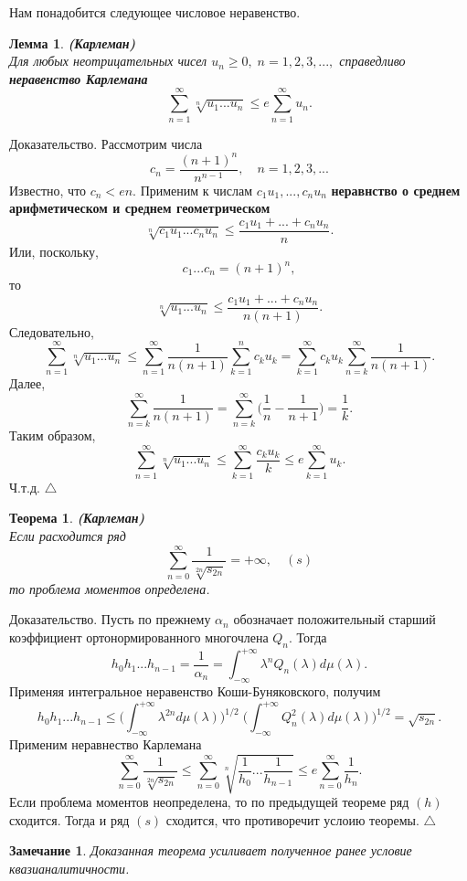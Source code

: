 \documentclass[12pt,a4paper]{article}
\theoremstyle{plain}   \newtheorem{Pro}{Задача}
\newtheorem{Rem}{Замечание}
\newtheorem{The}{Теорема}
\newtheorem{Lem}{Лемма}
\begin{document}
Нам понадобится следующее числовое неравенство.
\begin{Lem}
{\bfseries (Карлеман)}
\\
Для любых неотрицательных чисел
$ u_n \geq 0, \; n=1,2,3,..., $
справедливо
{\bfseries неравенство Карлемана}
$$
  \sum _{n=1}^{\infty}
  \sqrt[n]{u_1 ...u_n } \leq e
  \sum _{n=1}^{\infty} u_n .
$$
\end{Lem}
{\Large Доказательство.}
Рассмотрим числа
$$
  c_n =\frac{(n+1)^n}{n^{n-1}}, \quad n=1,2,3,...
$$
Известно, что
$ c_n <en. $
Применим к числам
$ c_1 u_1 ,...,c_n u_n $
{\bfseries неравнство о среднем арифметическом и среднем геометрическом}
$$
  \sqrt[n]{c_1 u_1 ...c_n u_n } \leq
  \frac{c_1 u_1 +...+c_n u_n }{n}.
$$
Или, поскольку,
$$
  c_1 ...c_n =(n+1)^n ,
$$
то
$$
 \sqrt[n]{u_1 ...u_n} \leq
 \frac{c_1 u_1 +...+c_n u_n}{n(n+1)}.
$$
Следовательно,
$$
  \sum _{n=1}^{\infty}\sqrt[n]{u_1 ...u_n} \leq
  \sum _{n=1}^{\infty} \frac{1}{n(n+1)}
  \sum _{k=1}^n c_k u_k =
  \sum _{k=1}^{\infty} c_k u_k
  \sum _{n=k}^{\infty} \frac{1}{n(n+1)}.
$$
Далее,
$$
  \sum _{n=k}^{\infty} \frac{1}{n(n+1)}=
  \sum _{n=k}^{\infty} \biggl ( \frac{1}{n}-
  \frac{1}{n+1} \biggr ) =\frac{1}{k} .
$$
Таким образом,
$$
  \sum _{n=1}^{\infty} \sqrt[n]{u_1 ...u_n} \leq
  \sum _{k=1}^{\infty}\frac{c_k u_k}{k} \leq
  e \sum _{k=1}^{\infty}u_k .
$$
Ч.т.д.
$ \triangle $
\begin{The}
{\bfseries (Карлеман)}
\\
Если расходится ряд
$$
  \sum _{n=0}^{\infty} \frac{1}{\sqrt[2n]{s_{2n}}}
  =+\infty , \quad (s)
$$
то проблема моментов определена.
\end{The}
{\Large Доказательство.}
Пусть по прежнему
$ \alpha _n $
обозначает положительный старший коэффициент ортонормированного
многочлена
$ Q_n . $
Тогда
$$
  h_0 h_1 ...h_{n-1}=\frac{1}{\alpha _n}=
  \int _{-\infty}^{+\infty}
  \lambda ^n Q_n (\lambda )d\mu (\lambda ).
$$
Применяя интегральное неравенство Коши-Буняковского, получим
$$
  h_0 h_1 ...h_{n-1} \leq
  \Biggl ( \int _{-\infty}^{+\infty}
  \lambda ^{2n}d\mu (\lambda ) \Biggr ) ^{1/2} \;
  \Biggl ( \int _{-\infty}^{+\infty}
  Q_n ^2 (\lambda )d\mu (\lambda ) \Biggr ) ^{1/2}
  =\sqrt{s_{2n}}.
$$
Применим неравнество Карлемана
$$
  \sum _{n=0}^{\infty} \frac{1}{\sqrt[2n]{s_{2n}}} \leq
  \sum _{n=0}^{\infty} \sqrt[n]{\frac{1}{h_0}...
  \frac{1}{h_{n-1}}} \leq e
  \sum _{n=0}^{\infty} \frac{1}{h_n} .
$$
Если проблема моментов неопределена, то по предыдущей теореме
ряд
$ (h) $
сходится. Тогда и ряд
$ (s) $
сходится, что противоречит услоию теоремы.
$ \triangle $
\begin{Rem}
Доказанная теорема усиливает полученное ранее условие
квазианалитичности.
\end{Rem}
\newpage
\end{document}
